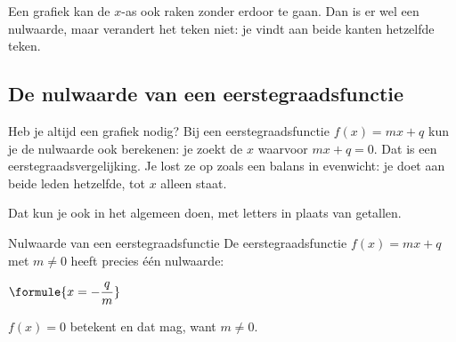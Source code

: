 Een grafiek kan de $x$-as ook raken zonder erdoor te gaan. Dan is er wel een nulwaarde, maar verandert het teken niet: je vindt aan beide kanten hetzelfde teken.

\begin{oefeningen}
\end{oefeningen}

\subsection{De nulwaarde van een eerstegraadsfunctie}

Heb je altijd een grafiek nodig? Bij een eerstegraadsfunctie $f(x) = mx + q$ kun je de nulwaarde ook berekenen: je zoekt de $x$ waarvoor $mx + q = 0$. Dat is een eerstegraadsvergelijking. Je lost ze op zoals een balans in evenwicht: je doet aan beide leden hetzelfde, tot $x$ alleen staat.


Dat kun je ook in het algemeen doen, met letters in plaats van getallen.

\begin{theorie}
\begin{stelling}{Nulwaarde van een eerstegraadsfunctie}
De eerstegraadsfunctie $f(x) = mx + q$ met $m \neq 0$ heeft precies één nulwaarde:

\vspace{1mm}
\qquad $\formule{x = -\dfrac{q}{m}}$
\end{stelling}
\begin{bewijs}
$f(x) = 0$ betekent
en dat mag, want $m \neq 0$.
\end{bewijs}
\end{theorie}


